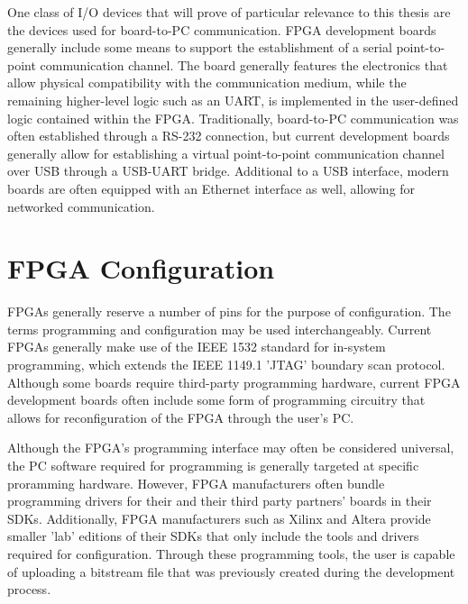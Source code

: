 \documentclass[main.tex]{subfiles}
\begin{document}
One class of I/O devices that will prove of particular relevance to this thesis are the devices used for board-to-PC communication. FPGA development boards generally include some means to support the establishment of a serial point-to-point communication channel. The board generally features the electronics that allow physical compatibility with the communication medium, while the remaining higher-level logic such as an UART, is implemented in the user-defined logic contained within the FPGA. Traditionally, board-to-PC communication was often established through a RS-232 connection, but current development boards generally allow for establishing a virtual point-to-point communication channel over USB through a USB-UART bridge. Additional to a USB interface, modern boards are often equipped with an Ethernet interface as well, allowing for networked communication.  

\section{FPGA Configuration}

FPGAs generally reserve a number of pins for the purpose of configuration. The terms programming and configuration may be used interchangeably. Current FPGAs generally make use of the IEEE 1532 standard for in-system programming, which extends the IEEE 1149.1 'JTAG' boundary scan protocol. Although some boards require third-party programming hardware, current FPGA development boards often include some form of programming circuitry that allows for reconfiguration of the FPGA through the user's PC.

Although the FPGA's programming interface may often be considered universal, the PC software required for programming is generally targeted at specific proramming hardware. However, FPGA manufacturers often bundle programming drivers for their and their third party partners' boards in their SDKs. Additionally, FPGA manufacturers such as Xilinx and Altera provide smaller 'lab' editions of their SDKs that only include the tools and drivers required for configuration. Through these programming tools, the user is capable of uploading a bitstream file that was previously created during the development process.
\end{document}
